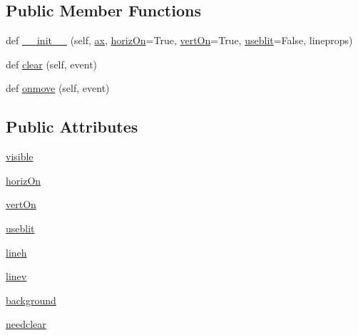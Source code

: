 \subsection*{Public Member Functions}
\begin{DoxyCompactItemize}
\item 
def \hyperlink{classmatplotlib_1_1widgets_1_1Cursor_af6837d4b25dadcc2460f95ea294262b5}{\+\_\+\+\_\+init\+\_\+\+\_\+} (self, \hyperlink{classmatplotlib_1_1widgets_1_1AxesWidget_ac0722858b7001d10a42055dc90420b4f}{ax}, \hyperlink{classmatplotlib_1_1widgets_1_1Cursor_a538983e20fa1ddbfe692f38c9c630b7d}{horiz\+On}=True, \hyperlink{classmatplotlib_1_1widgets_1_1Cursor_a68bdeb85df5ebf544dcd47a3507fdf85}{vert\+On}=True, \hyperlink{classmatplotlib_1_1widgets_1_1Cursor_a4ec189117f9f51c3361bffbd0ad843ad}{useblit}=False, lineprops)
\item 
def \hyperlink{classmatplotlib_1_1widgets_1_1Cursor_a27efde9f03a89f8167223a8025d4a0b3}{clear} (self, event)
\item 
def \hyperlink{classmatplotlib_1_1widgets_1_1Cursor_aec8fb1718b3227df5153efb1b0d2865f}{onmove} (self, event)
\end{DoxyCompactItemize}
\subsection*{Public Attributes}
\begin{DoxyCompactItemize}
\item 
\hyperlink{classmatplotlib_1_1widgets_1_1Cursor_a3fb3668addb52a42ac69a7b417b65f4b}{visible}
\item 
\hyperlink{classmatplotlib_1_1widgets_1_1Cursor_a538983e20fa1ddbfe692f38c9c630b7d}{horiz\+On}
\item 
\hyperlink{classmatplotlib_1_1widgets_1_1Cursor_a68bdeb85df5ebf544dcd47a3507fdf85}{vert\+On}
\item 
\hyperlink{classmatplotlib_1_1widgets_1_1Cursor_a4ec189117f9f51c3361bffbd0ad843ad}{useblit}
\item 
\hyperlink{classmatplotlib_1_1widgets_1_1Cursor_a60c692d7d2fe821e6404ad94369d1ca6}{lineh}
\item 
\hyperlink{classmatplotlib_1_1widgets_1_1Cursor_afb02a346b12788329dc494564a177647}{linev}
\item 
\hyperlink{classmatplotlib_1_1widgets_1_1Cursor_a9d7eef8744550104f1cc56dcaec42a1c}{background}
\item 
\hyperlink{classmatplotlib_1_1widgets_1_1Cursor_a82e225f4a9994d45e0210c0809511710}{needclear}
\end{DoxyCompactItemize}
